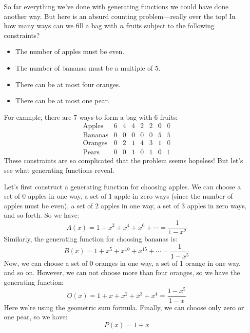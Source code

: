 So far everything we've done with generating functions we could have
done another way.  But here is an absurd counting problem---really
over the top!  In how many ways can we fill a bag with $n$ fruits
subject to the following constraints?

\begin{itemize}
\item The number of apples must be even.
\item The number of bananas must be a multiple of 5.
\item There can be at most four oranges.
\item There can be at most one pear.
\end{itemize}

For example, there are 7 ways to form a bag with 6 fruits:
%
\[
\begin{array}{c|ccccccc}
\text{Apples}  & 6 & 4 & 4 & 2 & 2 & 0 & 0 \\
\text{Bananas} & 0 & 0 & 0 & 0 & 0 & 5 & 5 \\
\text{Oranges} & 0 & 2 & 1 & 4 & 3 & 1 & 0 \\
\text{Pears}   & 0 & 0 & 1 & 0 & 1 & 0 & 1
\end{array}
\]
%
These constraints are so complicated that the problem seems hopeless!
But let's see what generating functions reveal.

Let's first construct a generating function for choosing apples.  We
can choose a set of 0 apples in one way, a set of 1 apple in zero
ways (since the number of apples must be even), a set of 2 apples in
one way, a set of 3 apples in zero ways, and so forth.  So we have:
%
\[
A(x) = 1 + x^2 + x^4 + x^6 + \cdots = \frac{1}{1 - x^2}
\]
%
Similarly, the generating function for choosing bananas is:
%
\[
B(x) = 1 + x^5 + x^{10} + x^{15} + \cdots = \frac{1}{1 - x^5}
\]
Now, we can choose a set of 0 oranges in one way, a set of 1 orange in
one way, and so on.  However, we can not choose more than four
oranges, so we have the generating function:
%
\[
O(x) = 1 + x + x^2 + x^3 + x^4 = \frac{1-x^5}{1-x}
\]
%
Here we're using the geometric sum formula.  Finally, we can choose
only zero or one pear, so we have:
%
\[
P(x) = 1 + x
\]

